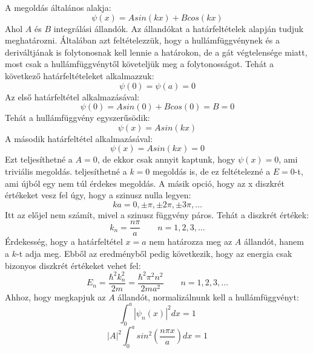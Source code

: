 \documentclass[a4paper,12pt]{article}
\begin{document}
A megoldás általános alakja:
\begin{equation}
    \psi(x) = A sin(kx) + B cos(kx)
\end{equation}
Ahol $A$ és $B$ integrálási állandók. Az állandókat a határfeltételek alapján tudjuk meghatározni. Általában azt feltételezzük, hogy a hullámfüggvénynek és a deriváltjának is folytonosnak kell lennie a határokon,
de a gát végtelensége miatt, most csak a hullámfüggvénytől követeljük meg a folytonosságot. Tehát a következő határfeltételeket alkalmazzuk:
\begin{equation}
    \psi(0) = \psi(a) = 0
\end{equation}
Az első határfeltétel alkalmazásával:
\begin{equation}
    \psi(0) = A sin(0) + B cos(0) = B = 0
\end{equation}
Tehát a hullámfüggvény egyszerűsödik:
\begin{equation}
    \psi(x) = A sin(kx)
\end{equation}
A második határfeltétel alkalmazásával:
\begin{equation}
    \psi(x) = A sin(kx) = 0
\end{equation}
Ezt teljesíthetné a $A = 0$, de ekkor csak annyit kaptunk, hogy $\psi (x) = 0$, ami triviális megoldás. teljesíthetné a $k = 0$ megoldás is, de ez feltételezné a $E = 0$-t, ami újból egy nem túl érdekes megoldás.
 A másik opció, hogy az x diszkrét értékeket vesz fel úgy, hogy a szinusz nulla legyen:
\begin{equation}
    k a = 0, \pm \pi, \pm 2\pi, \pm 3\pi, \ldots
\end{equation}
Itt az előjel nem számít, mivel a szinusz függvény páros. Tehát a diszkrét értékek:
\begin{equation}
    k_n = \frac{n \pi}{a} \quad \quad n = 1, 2, 3, \ldots
\end{equation}
Érdekesség, hogy a határfeltétel $x = a$ nem határozza meg az $A$ állandót, hanem a $k$-t adja meg. Ebből az eredményből pedig következik, hogy az energia csak bizonyos diszkrét értékeket vehet fel:
\begin{equation}
    E_n = \frac{\hbar^2 k_n^2}{2m} = \frac{\hbar^2 \pi^2 n^2}{2m a^2} \quad \quad n = 1, 2, 3, \ldots
\end{equation}
Ahhoz, hogy megkapjuk az $A$ állandót, normalizálnunk kell a hullámfüggvényt:
\begin{equation}
    \int_0^a |\psi_n(x)|^2 dx = 1
\end{equation}
\begin{equation}
    |A|^2 \int_0^a sin^2\left(\frac{n \pi x}{a}\right) dx = 1
\end{equation}
\end{document}
